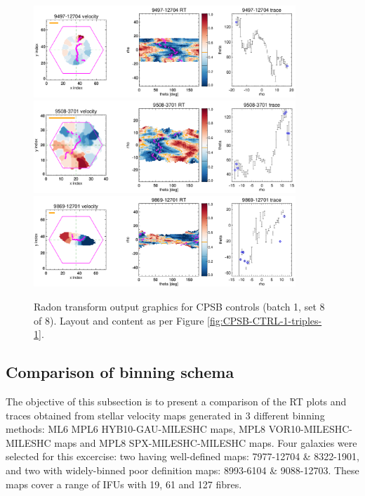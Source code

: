 \documentclass[fleqn,usenatbib]{mnras}
\begin{document}
\begin{figure}
    \centering
    \includegraphics[width=0.88\textwidth]{Images/SN1-MC250/CPSB-CTRL-1-triples/9497-12704-1-250-10.png}
    \includegraphics[width=0.88\textwidth]{Images/SN1-MC250/CPSB-CTRL-1-triples/9508-3701-1-250-10.png}
    \includegraphics[width=0.88\textwidth]{Images/SN1-MC250/CPSB-CTRL-1-triples/9869-12701-1-250-10.png}    
    \caption{Radon transform output graphics for CPSB controls (batch 1, set 8 of 8). Layout and content as per Figure \ref{fig:CPSB-CTRL-1-triples-1}.}
    \label{fig:CPSB-CTRL-1-triples-8}
\end{figure}


\subsection{Comparison of binning schema}
The objective of this subsection is to present a comparison of the RT plots and traces obtained from stellar velocity maps generated in 3 different binning methods: ML6 MPL6 HYB10-GAU-MILESHC maps, MPL8 VOR10-MILESHC-MILESHC maps and MPL8 SPX-MILESHC-MILESHC maps. Four galaxies were selected for this excercise: two having well-defined maps: 7977-12704 \& 8322-1901, and two with widely-binned poor definition maps: 8993-6104 \& 9088-12703. These maps cover a range of IFUs with 19, 61 and 127 fibres.
\end{document}
